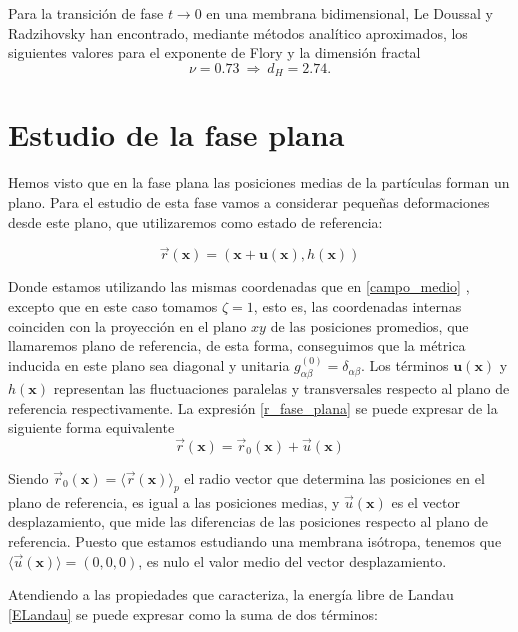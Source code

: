 Para la transición de fase $t\rightarrow 0$ en una membrana bidimensional,
Le Doussal y Radzihovsky \cite{Doussal:nu} han encontrado, mediante métodos analítico aproximados,
los siguientes valores para el exponente de Flory y la dimensión fractal 
\begin{equation} 
 \nu=0.73\ \Rightarrow\ d_H=2.74 .
\end{equation}
\section{Estudio de la fase plana}

Hemos visto que en la fase plana las posiciones medias de la partículas forman
un plano. Para el estudio de esta fase vamos a considerar pequeñas
deformaciones desde este plano, que utilizaremos como estado de referencia:

\begin{equation}\label{r_fase_plana}
\vec{r}(\mathbf{x})=(\mathbf{x}+\mathbf{u(\mathbf{x})},h(\mathbf{x}))
\end{equation}

Donde estamos utilizando las mismas coordenadas que en \ref{campo_medio} , excepto que en
este caso tomamos $\zeta=1$, esto es, las coordenadas internas coinciden con
la proyección en el plano $xy$ de las posiciones promedios, que llamaremos
plano de referencia, de esta forma, conseguimos que la métrica inducida en
este plano sea diagonal y unitaria
$g^{(0)}_{\alpha\beta}=\delta_{\alpha\beta}$. Los términos
$\mathbf{u(\mathbf{x})}$ y $h(\mathbf{x})$ 
representan las fluctuaciones paralelas y transversales respecto al plano de
referencia respectivamente. La expresión \eqref{r_fase_plana} se puede
expresar de la siguiente forma equivalente
\begin{equation}\label{deformacion}
\vec{r}(\mathbf{x})=\vec{r}_0(\mathbf{x})+\vec{u}(\mathbf{x})
\end{equation}

Siendo $\vec{r}_0(\mathbf{x})=\langle\vec{r}(\mathbf{x}) \rangle_p$ el radio
vector que determina las posiciones en el plano de referencia, es igual a las
posiciones medias, y $\vec{u}(\mathbf{x})$ es el vector desplazamiento, que
mide las diferencias de las posiciones respecto al plano de referencia. Puesto
que estamos estudiando una membrana isótropa, tenemos que
$\langle\vec{u}(\mathbf{x}) \rangle=(0,0,0)$, es nulo el valor medio del
vector desplazamiento.

Atendiendo a las propiedades que caracteriza, la energía libre de Landau
\eqref{ELandau} se puede expresar como la suma de dos términos:

